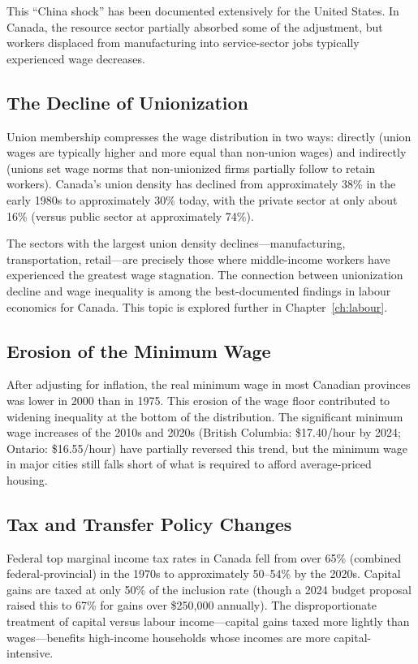 This ``China shock'' has been documented extensively for the United States. In Canada, the resource sector partially absorbed some of the adjustment, but workers displaced from manufacturing into service-sector jobs typically experienced wage decreases.

\subsection{The Decline of Unionization}

Union membership compresses the wage distribution in two ways: directly (union wages are typically higher and more equal than non-union wages) and indirectly (unions set wage norms that non-unionized firms partially follow to retain workers). Canada's union density has declined from approximately 38\% in the early 1980s to approximately 30\% today, with the private sector at only about 16\% (versus public sector at approximately 74\%).

The sectors with the largest union density declines---manufacturing, transportation, retail---are precisely those where middle-income workers have experienced the greatest wage stagnation. The connection between unionization decline and wage inequality is among the best-documented findings in labour economics for Canada. This topic is explored further in Chapter~\ref{ch:labour}.

\subsection{Erosion of the Minimum Wage}

After adjusting for inflation, the real minimum wage in most Canadian provinces was lower in 2000 than in 1975. This erosion of the wage floor contributed to widening inequality at the bottom of the distribution. The significant minimum wage increases of the 2010s and 2020s (British Columbia: \$17.40/hour by 2024; Ontario: \$16.55/hour) have partially reversed this trend, but the minimum wage in major cities still falls short of what is required to afford average-priced housing.

\subsection{Tax and Transfer Policy Changes}

Federal top marginal income tax rates in Canada fell from over 65\% (combined federal-provincial) in the 1970s to approximately 50--54\% by the 2020s. Capital gains are taxed at only 50\% of the inclusion rate (though a 2024 budget proposal raised this to 67\% for gains over \$250,000 annually). The disproportionate treatment of capital versus labour income---capital gains taxed more lightly than wages---benefits high-income households whose incomes are more capital-intensive.

